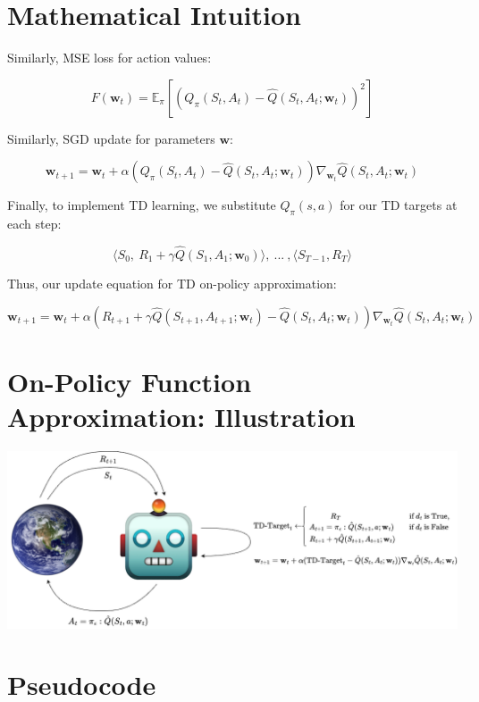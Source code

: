 \documentclass[
  letterpaper,
  DIV=11,
  numbers=noendperiod]{scrreprt}
\begin{document}
\section{Mathematical Intuition}\label{mathematical-intuition}

Similarly, MSE loss for action values:

\[
F(\mathbf{w}_{t}) = \mathbb{E}_{\pi}[(Q_{\pi}(S_{t},A_{t}) - \hat{Q}(S_{t},A_{t}; \mathbf{w}_{t}))^{2}]
\]

Similarly, SGD update for parameters \(\mathbf{w}\):

\[
\mathbf{w}_{t+1} = \mathbf{w}_{t} + \alpha(Q_{\pi}(S_{t},A_{t}) - \hat{Q}(S_{t},A_{t}; \mathbf{w}_{t}))\nabla_{\mathbf{w}_{t}} \hat{Q}(S_{t},A_{t}; \mathbf{w}_{t})
\]

Finally, to implement TD learning, we substitute \(Q_{\pi}(s,a)\) for
our TD targets at each step:

\[
\langle S_{0}, \ R_{1} + \gamma \hat{Q}(S_{1},A_{1}; \mathbf{w}_{0})\rangle, \ ... \ ,\langle S_{T-1},R_{T}\rangle
\]

Thus, our update equation for TD on-policy approximation:

\[
\mathbf{w}_{t+1} = \mathbf{w}_{t} + \alpha(R_{t+1} + \gamma \hat{Q}(S_{t+1},A_{t+1}; \mathbf{w}_{t}) - \hat{Q}(S_{t},A_{t}; \mathbf{w}_{t}))\nabla_{\mathbf{w}_{t}} \hat{Q}(S_{t},A_{t}; \mathbf{w}_{t})
\]

\section{On-Policy Function Approximation:
Illustration}\label{on-policy-function-approximation-illustration}

\begin{center}
\includegraphics[width=1\linewidth,height=\textheight,keepaspectratio]{lecture7/images/SemiGradientSARSA.png}
\end{center}

\section{Pseudocode}\label{pseudocode-13}
\end{document}
